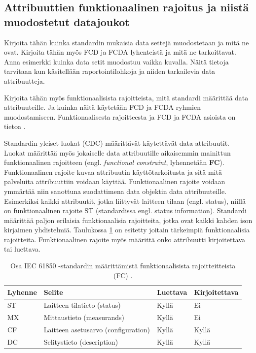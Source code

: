\subsection{Attribuuttien funktionaalinen rajoitus ja niistä muodostetut datajoukot}
\begin{it}
	Kirjoita tähän kuinka standardin mukaisia data settejä muodostetaan ja mitä ne ovat. Kirjoita tähän myös FCD ja FCDA lyhenteistä ja mitä ne tarkoittavat. Anna esimerkki kuinka data setit muodostuu vaikka kuvalla. Näitä tietoja tarvitaan kun käsitellään raportointilohkoja ja niiden tarkailevia data attribuutteja.
	
	Kirjoita tähän myös funktionaalisista rajoitteista, mitä standardi määrittää data attribuuteille. Ja kuinka näitä käytetään FCD ja FCDA ryhmien muodostamiseen. Funktionaalisesta rajoitteesta ja FCD ja FCDA asioista on tietoa \cite[s.~54--55]{IEC61850-7-2}.
\end{it}

Standardin yleiset luokat (CDC) määrittävät käytettävät data attribuutit. Luokat määrittää myös jokaiselle data attribuutille aikaisemmin mainittun funktionaalinen rajoitteen (engl. \emph{functional constraint}, lyhennetään \textbf{FC}). Funktionaalinen rajoite kuvaa attribuutin käyttötarkoitusta ja sitä mitä palveluita attribuuttiin voidaan käyttää. Funktionaalinen rajoite voidaan ymmärtää niin sanottuna suodattimena data objektin data attribuuteille. Esimerkiksi kaikki attribuutit, jotka liittyvät laitteen tilaan (engl. status), niillä on funktionaalinen rajoite ST (standardissa engl. status information). Standardi määrittää paljon erilaisia funktionaalisia rajoitteita, jotka ovat kaikki kahden ison kirjaimen yhdistelmiä. Taulukossa \ref{tab:iec61850-functional-constraints} on esitetty joitain tärkeimpiä funktionaalisia rajoitteita. Funktionaalinen rajoite myös määrittä onko attribuutti kirjoitettava tai luettava.

\begin{table}[ht!]
	\caption{Osa IEC 61850 -standardin määrittämistä funktionaalisista rajoitteitteista (FC) \cite[s.~54]{IEC61850-7-2}.}
	\label{tab:iec61850-functional-constraints}
	\begin{tabular}{l | l | l | l}
		\hline
		\textbf{Lyhenne} & \textbf{Selite} & \textbf{Luettava} & \textbf{Kirjoitettava} \\
		\hline \hline
		ST & Laitteen tilatieto (status) & Kyllä & Ei \\
		MX & Mittaustieto (measurands) & Kyllä & Ei \\
		CF & Laitteen asetusarvo (configuration) & Kyllä & Kyllä \\
		DC & Selitystieto (description) & Kyllä & Kyllä \\
		\hline
	\end{tabular}
\end{table}


